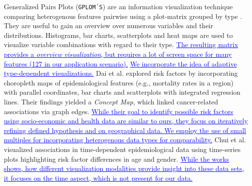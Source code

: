 \documentclass[journal]{style/vgtc} 			          %
\newcommand{\add}[1]{\textcolor{blue}{\uline{#1}}}
\begin{document}
Generalized Pairs Plots (\texttt{GPLOM´S}) are an information visualization technique comparing heterogenous features pairwise using a plot-matrix grouped by type \cite{GPLOMS, Francois2013}.
%
They are useful to gain an overview over numerous variables and their distributions.
%
Histograms, bar charts, scatterplots and heat maps are used to visualize variable combinations with regard to their type.
%
\add{The resulting matrix provides a \emph{overview visualization}, but requires a lot of screen space for many features (127 in our application scenario).}
%
%
%
\add{We incorporate the idea of adaptive type-dependent visualizations.}
%
Dai et al. \cite{Dai2005} explored risk factors by incorporating choropleth maps of epidemiological features (e.g., mortality rates in a region) with parallel coordinates, bar charts and scatterplots with integrated regression lines.
%
Their findings yielded a \emph{Concept Map}, which linked cancer-related associations via graph edges.
%
\add{While their goal to identify possible risk factors using socio-economic and health data are similar to ours, they focus on iteratively refining defined hypothesis and on geographical data.
%
We employ the use of small multiples for incorporating heterogenous data types for comparability.}
%
Chui et al. \cite{Chui2011} visualized associations in time-dependent epidemiological data using time-series plots highlighting risk factor differences in age and gender.
%
\add{%
While the works shows, how different visualization modalities provide insight into these data sets, it focuses on the time aspect, which is not present for our data.}
%
\end{document}
